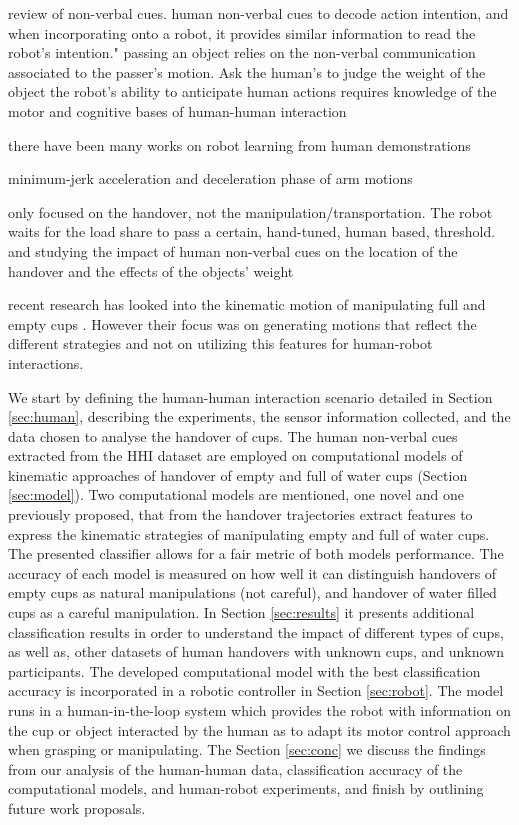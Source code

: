 \cite{mavridis_review_2015} review of non-verbal cues. 
\cite{duarte_action_2018} human non-verbal cues to decode action intention, and when incorporating onto a robot, it provides similar information to read the robot's intention." 
\cite{palinko_communicative_2015} passing an object relies on the non-verbal communication associated to the passer's motion. Ask the human's to judge the weight of the object
the robot's ability to anticipate human actions requires knowledge of the motor and cognitive bases of human-human interaction \cite{sciutti_humanizing_2018} \cite{admoni_robot_2016} 

there have been many works on robot learning from human demonstrations \cite{ravichandar_recent_2020}

minimum-jerk acceleration and deceleration phase of arm motions \cite{fligge_minimum_2012}

\cite{Medina2016} only focused on the handover, not the manipulation/transportation. The robot waits for the load share to pass a certain, hand-tuned, human based, threshold.  and studying the impact of human non-verbal cues on the location of the handover \cite{kato_where_2019} and the effects of the objects' weight \cite{hansen_humanhuman_2017}

recent research has looked into the kinematic motion of manipulating full and empty cups \cite{lastrico_careful_2021}. However their focus was on generating motions that reflect the different strategies and not on utilizing this features for human-robot interactions. 

We start by defining the human-human interaction scenario detailed in Section \ref{sec:human}, describing the experiments, the sensor information collected, and the data chosen to analyse the handover of cups. The human non-verbal cues extracted from the HHI dataset are employed on computational models of kinematic approaches of handover of empty and full of water cups (Section \ref{sec:model}). Two computational models are mentioned, one novel and one previously proposed, that from the handover trajectories extract features to express the kinematic strategies of manipulating empty and full of water cups. The presented classifier allows for a fair metric of both models performance. The accuracy of each model is measured on how well it can distinguish handovers of empty cups as natural manipulations (not careful), and handover of water filled cups as a careful manipulation. In Section \ref{sec:results} it presents additional classification results in order to understand the impact of different types of cups, as well as, other datasets of human handovers with unknown cups, and unknown participants. The developed computational model with the best classification accuracy is incorporated in a robotic controller in Section \ref{sec:robot}. The model runs in a human-in-the-loop system which provides the robot with information on the cup or object interacted by the human as to adapt its motor control approach when grasping or manipulating. The Section \ref{sec:conc} we discuss the findings from our analysis of the human-human data, classification accuracy of the computational models, and human-robot experiments, and finish by outlining future work proposals.  

